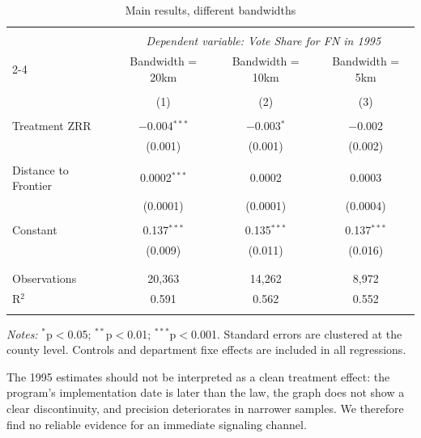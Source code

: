 \begin{appendices}
\begin{table}[!htbp] 
\centering 
\small
\caption{Main results, different bandwidths} 
\label{tab:rdd_results_diffbandwidth-1995} 
\begin{threeparttable}
\begin{tabular}{@{\extracolsep{2pt}}lccc} 
\\[-1.8ex]\hline 
\hline \\[-1.8ex] 
 & \multicolumn{3}{c}{\textit{Dependent variable: Vote Share for FN in 1995}} \\ 
\cline{2-4} 
 & Bandwidth = 20km & Bandwidth = 10km & Bandwidth = 5km \\ 
\\[-1.8ex] & (1) & (2) & (3)\\ 
\hline \\[-1.8ex] 
 Treatment ZRR & $-$0.004$^{***}$ & $-$0.003$^{*}$ & $-$0.002 \\ 
  & (0.001) & (0.001) & (0.002) \\ 
  & & & \\ 
 Distance to Frontier & 0.0002$^{***}$ & 0.0002 & 0.0003 \\ 
  & (0.0001) & (0.0001) & (0.0004) \\ 
  & & & \\ 
 Constant & 0.137$^{***}$ & 0.135$^{***}$ & 0.137$^{***}$ \\ 
  & (0.009) & (0.011) & (0.016) \\ 
  & & & \\ 
\hline \\[-1.8ex] 
Observations & 20,363 & 14,262 & 8,972 \\ 
R$^{2}$ & 0.591 & 0.562 & 0.552 \\ 
\hline 
\hline \\[-1.8ex] 
\end{tabular} 
\begin{tablenotes}
  \footnotesize
  \item \textit{Notes:} $^{*}$p$<$0.05; $^{**}$p$<$0.01; $^{***}$p$<$0.001. Standard errors are clustered at the county level. Controls and department fixe effects are included in all regressions.
\end{tablenotes}
\end{threeparttable}
\end{table}

\fi

The 1995 estimates should not be interpreted as a clean treatment effect: the program's implementation date is later than the law, the graph does not show a clear discontinuity, and precision deteriorates in narrower samples. We therefore find no reliable evidence for an immediate signaling channel.



\end{appendices}
